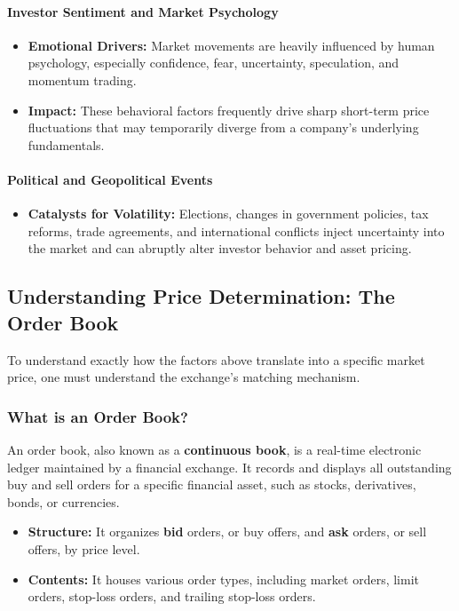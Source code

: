 \documentclass[12pt,openany]{book}
\begin{document}
\paragraph{Investor Sentiment and Market Psychology}
\begin{itemize}[leftmargin=*]
    \item \textbf{Emotional Drivers:} Market movements are heavily influenced by human psychology, especially confidence, fear, uncertainty, speculation, and momentum trading.
    \item \textbf{Impact:} These behavioral factors frequently drive sharp short-term price fluctuations that may temporarily diverge from a company's underlying fundamentals.
\end{itemize}

\paragraph{Political and Geopolitical Events}
\begin{itemize}[leftmargin=*]
    \item \textbf{Catalysts for Volatility:} Elections, changes in government policies, tax reforms, trade agreements, and international conflicts inject uncertainty into the market and can abruptly alter investor behavior and asset pricing.
\end{itemize}

\subsection{Understanding Price Determination: The Order Book}
To understand exactly how the factors above translate into a specific market price, one must understand the exchange's matching mechanism.

\subsubsection{What is an Order Book?}
An order book, also known as a \textbf{continuous book}, is a real-time electronic ledger maintained by a financial exchange. It records and displays all outstanding buy and sell orders for a specific financial asset, such as stocks, derivatives, bonds, or currencies.

\begin{itemize}[leftmargin=*]
    \item \textbf{Structure:} It organizes \textbf{bid} orders, or buy offers, and \textbf{ask} orders, or sell offers, by price level.
    \item \textbf{Contents:} It houses various order types, including market orders, limit orders, stop-loss orders, and trailing stop-loss orders.
\end{itemize}
\end{document}
